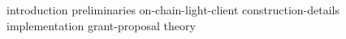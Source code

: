 {introduction}
{preliminaries}
{on-chain-light-client}
{construction-details}
{implementation}
{grant-proposal}
{theory}





